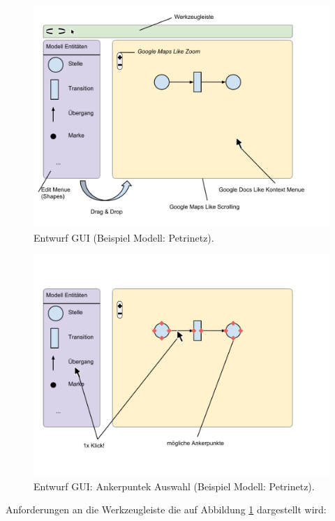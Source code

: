 \begin{figure}[h!]
  \centering
  \includegraphics[width=1.0\textwidth]{Figures/Entwurf_GUI.pdf}
  \caption{Entwurf GUI (Beispiel Modell: Petrinetz).}\label{fig.gui}
\end{figure}

\begin{figure}[h!]
  \centering
  \includegraphics[width=1.0\textwidth]{Figures/Entwurf_GUI_Anker.pdf}
  \caption{Entwurf GUI: Ankerpuntek Auswahl (Beispiel Modell: Petrinetz).}\label{fig.guiAnker}
\end{figure}

\noindent Anforderungen an die Werkzeugleiste die auf Abbildung
\ref{fig.gui} dargestellt wird:

